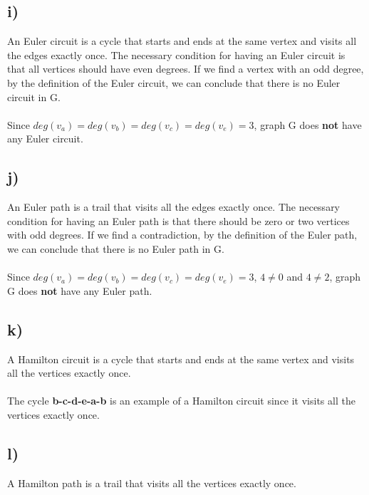 \documentclass[12pt]{article}
\begin{document}
\subsection*{i) }
An Euler circuit is a cycle that starts and ends at the same vertex and visits all the edges exactly once. The necessary condition for having an Euler circuit is that all vertices should have even degrees. If we find a vertex with an odd degree, by the definition of the Euler circuit, we can conclude that there is no Euler circuit in G. \\\\

Since $deg(v_a) = deg(v_b) = deg(v_c) = deg(v_e) = 3$, graph G does \textbf{not} have any Euler circuit.

\subsection*{j) }

An Euler path is a trail that visits all the edges exactly once. The necessary condition for having an Euler path is that there should be zero or two vertices with odd degrees. If we find a contradiction, by the definition of the Euler path, we can conclude that there is no Euler path in G. \\\\

Since $deg(v_a) = deg(v_b) = deg(v_c) = deg(v_e) = 3$, $4 \neq 0$ and $4 \neq 2$, graph G does \textbf{not} have any Euler path.

\subsection*{k) }

A Hamilton circuit is a cycle that starts and ends at the same vertex and visits all the vertices exactly once. \\\\

The cycle \textbf{b-c-d-e-a-b} is an example of a Hamilton circuit since it visits all the vertices exactly once. 

\subsection*{l) }

A Hamilton path is a trail that visits all the vertices exactly once. \\\\
\end{document}
